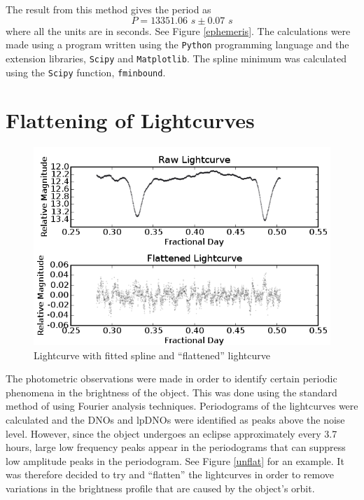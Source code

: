 The result from this method gives the period as $$ P = 13351.06 \hspace{4pt}s \pm 0.07 \hspace{4pt}s $$ where all the units are in seconds. See Figure \ref{ephemeris}.  The calculations were made using a program written using the \texttt{Python} programming language and the extension libraries, \texttt{Scipy} and \texttt{Matplotlib}. The spline minimum was calculated using the \texttt{Scipy} function, \texttt{fminbound}.


\section{Flattening of Lightcurves}

\label{flat_section}

\begin{figure}
\begin{center}
\includegraphics[width=0.85\columnwidth,bb=0 0 600 400]{images/splineandflat.png}
\caption{Lightcurve with fitted spline and ``flattened'' lightcurve}
\label{splineandflat}
\end{center}
\end{figure}





The photometric observations were made in order to identify certain periodic phenomena in the brightness of the object. This was done using the standard method of using Fourier analysis techniques. Periodograms of the lightcurves were calculated and the DNOs and lpDNOs were identified as peaks above the noise level. However, since the object undergoes an eclipse approximately every 3.7 hours, large low frequency peaks appear in the periodograms that can suppress low amplitude peaks in the periodogram. See Figure \ref{unflat} for an example. It was therefore decided to try and ``flatten'' the lightcurves in order to remove variations in the brightness profile that are caused by the object's orbit.


